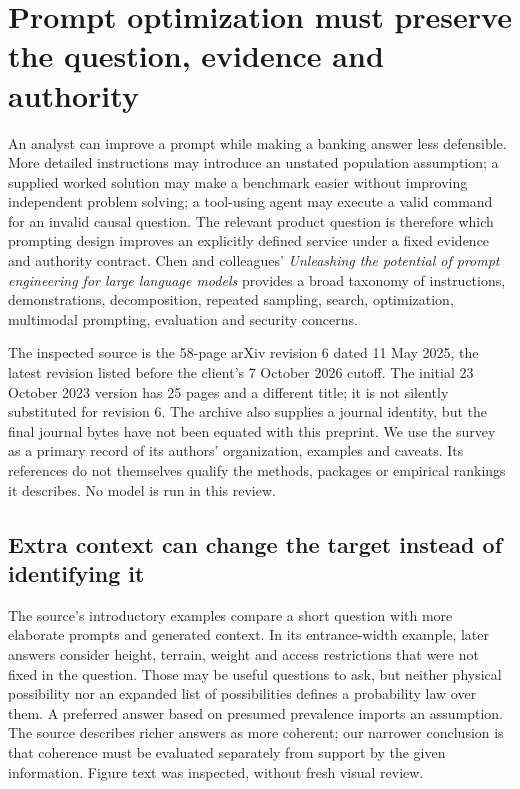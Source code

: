 \section{Prompt optimization must preserve the question, evidence and authority}
\label{sec:exec24-prompt-engineering}

An analyst can improve a prompt while making a banking answer less defensible.
More detailed instructions may introduce an unstated population assumption;
a supplied worked solution may make a benchmark easier without improving
independent problem solving; a tool-using agent may execute a valid command for
an invalid causal question. The relevant product question is therefore which
prompting design improves an explicitly defined service under a fixed evidence
and authority contract. Chen and colleagues' \emph{Unleashing the potential of
prompt engineering for large language models} provides a broad taxonomy of
instructions, demonstrations, decomposition, repeated sampling, search,
optimization, multimodal prompting, evaluation and security concerns.
\citep{exec24_promptengineering_original}

The inspected source is the 58-page arXiv revision 6 dated 11 May 2025, the
latest revision listed before the client's 7 October 2026 cutoff. The initial
23 October 2023 version has 25 pages and a different title; it is not silently
substituted for revision 6. The archive also supplies a journal identity, but
the final journal bytes have not been equated with this preprint. We use the
survey as a primary record of its authors' organization, examples and caveats.
Its references do not themselves qualify the methods, packages or empirical
rankings it describes. No model is run in this review.

\subsection{Extra context can change the target instead of identifying it}

The source's introductory examples compare a short question with more elaborate
prompts and generated context. In its entrance-width example, later answers
consider height, terrain, weight and access restrictions that were not fixed in
the question. Those may be useful questions to ask, but neither physical
possibility nor an expanded list of possibilities defines a probability law over
them. A preferred answer based on presumed prevalence imports an assumption.
The source describes richer answers as more coherent; our narrower conclusion
is that coherence must be evaluated separately from support by the given
information. Figure text was inspected, without fresh visual review.
\citep{exec24_promptengineering_original}

